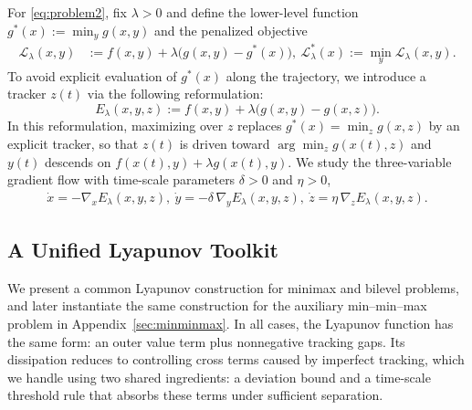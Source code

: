 \documentclass{article}
\newcommand{\1}{\mathbf{1}}
\begin{document}
For \ref{eq:problem2}, fix $\lambda>0$ and define the lower-level function $g^*(x):=\min_y g(x,y)$ and the penalized objective
\begin{equation}\label{eq:bilevel-value-f}
\begin{aligned}
\mathcal L_\lambda(x,y)
&:= f(x,y)+\lambda\bigl(g(x,y)-g^*(x)\bigr),\
\mathcal L_\lambda^*(x):= \min_y \mathcal L_\lambda(x,y).
\end{aligned}
\end{equation}
To avoid explicit evaluation of $g^*(x)$ along the trajectory, we introduce a tracker $z(t)$ via the following reformulation:
\begin{equation}\label{eq:Elambda-unified}
E_\lambda(x,y,z):=f(x,y)+\lambda\bigl(g(x,y)-g(x,z)\bigr).
\end{equation}
In this reformulation, maximizing over $z$ replaces $g^*(x)=\min_z g(x,z)$ by an explicit tracker, so that $z(t)$ is driven toward $\arg\min_z g(x(t),z)$ and $y(t)$ descends on $f(x(t),y)+\lambda g(x(t),y)$.
We study the three-variable gradient flow with time-scale parameters $\delta>0$ and $\eta>0$,
\begin{equation}\label{eq:flow-bilevel-unified}
\begin{aligned}
\dot x = -\nabla_x E_\lambda(x,y,z),\
\dot y = -\delta\,\nabla_y E_\lambda(x,y,z),\
\dot z = \eta\,\nabla_z E_\lambda(x,y,z).
\end{aligned}
\end{equation}





\subsection{A Unified Lyapunov Toolkit}\label{subsec:unified-lyap}
We present a common Lyapunov construction for minimax and bilevel problems, and later instantiate the same construction for the auxiliary min--min--max problem in Appendix~\ref{sec:minminmax}. In all cases, the Lyapunov function has the same form: an outer value term plus nonnegative tracking gaps. Its dissipation reduces to controlling cross terms caused by imperfect tracking, which we handle using two shared ingredients: a deviation bound and a time-scale threshold rule that absorbs these terms under sufficient separation.
\end{document}
